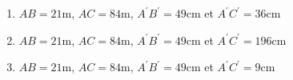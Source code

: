 \documentclass[oneside,twoside]{book}
\begin{document}
\begin{enumerate}
\begin{enumerate}
\item\MauvaiseReponse $AB=21\mathrm{m}$, $AC=84\mathrm{m}$, $A^{\prime}B^{\prime}=49\mathrm{cm}$ et $A^{\prime}C^{\prime}=36\mathrm{cm}$
\item\BonneReponse $AB=21\mathrm{m}$, $AC=84\mathrm{m}$, $A^{\prime}B^{\prime}=49\mathrm{cm}$ et $A^{\prime}C^{\prime}=196\mathrm{cm}$

\item\MauvaiseReponse $AB=21\mathrm{m}$, $AC=84\mathrm{m}$, $A^{\prime}B^{\prime}=49\mathrm{cm}$ et $A^{\prime}C^{\prime}=9\mathrm{cm}$

\end{enumerate}



\end{enumerate}
\end{document}
